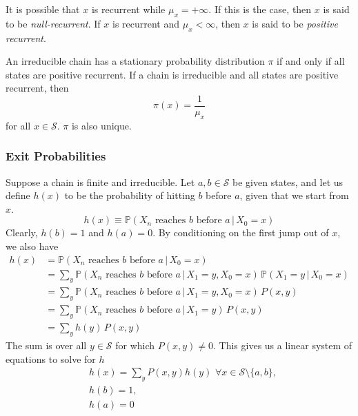   \begin{definition}
    It is possible that $x$ is recurrent while $\mu_x = +\infty$. If this is the case, then $x$ is said to be \textit{null-recurrent}. If $x$ is recurrent and $\mu_x < \infty$, then $x$ is said to be \textit{positive recurrent}. 
  \end{definition}

  \begin{theorem}
    An irreducible chain has a stationary probability distribution $\pi$ if and only if all states are positive recurrent. If a chain is irreducible and all states are positive recurrent, then 
    \begin{equation}
      \pi(x) = \frac{1}{\mu_x}
    \end{equation}
    for all $x \in \mathcal{S}$. $\pi$ is also unique. 
  \end{theorem}

  \subsubsection{Exit Probabilities}

    Suppose a chain is finite and irreducible. Let $a, b \in \mathcal{S}$ be given states, and let us define $h(x)$ to be the probability of hitting $b$ before $a$, given that we start from $x$. 
    \begin{equation}
      h(x) \equiv \mathbb{P} (X_n \text{ reaches } b \text{ before } a \, | \, X_0 = x)
    \end{equation}
    Clearly, $h(b) = 1$ and $h(a) = 0$. By conditioning on the first jump out of $x$, we also have 
    \begin{align*}
      h(x) & = \mathbb{P}(X_n \text{ reaches } b \text{ before } a \, | \, X_0 = x) \\
      & = \sum_{y} \mathbb{P}(X_n \text{ reaches } b \text{ before } a \, | \, X_1 = y, X_0 = x) \, \mathbb{P}(X_1 = y \,|\,X_0 = x) \\
      & = \sum_y \mathbb{P}(X_n \text{ reaches } b \text{ before } a \, | \,X_1 = y, X_0 = x) \, P(x, y) \\
      & = \sum_y \mathbb{P}(X_n \text{ reaches } b \text{ before } a \, | \,X_1 = y) \, P(x, y) \\
      & = \sum_y h(y) \, P(x, y) 
    \end{align*}
    The sum is over all $y \in \mathcal{S}$ for which $P(x, y) \neq 0$. This gives us a linear system of equations to solve for $h$
    \begin{align*}
      & h(x) = \sum_y P(x, y) h(y) \,\, \forall x \in \mathcal{S} \setminus \{a, b\}, \\
      & h(b) = 1, \\
      & h(a) = 0
    \end{align*}

